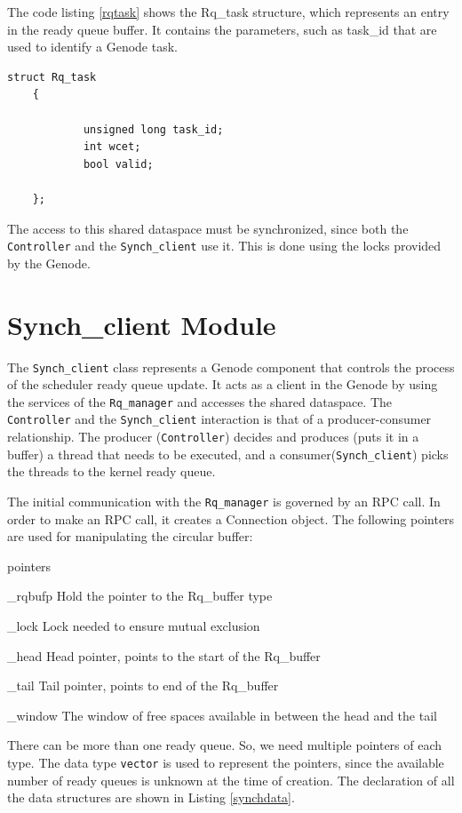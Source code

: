The code listing \ref{rqtask} shows the Rq\_task structure, which represents an entry in the ready queue buffer. It contains the parameters, such as task\_id that are used to identify a Genode task.

\begin{lstlisting}[caption={Rq\_task structure},label={rqtask}, style=customcpp]
 struct Rq_task
 	{
 
			unsigned long task_id;
 			int wcet;
 			bool valid;
 
 	};
\end{lstlisting}

The access to this shared dataspace must be synchronized, since both the \texttt{Controller} and the \texttt{Synch\_client} use it. This is done using the locks provided by the Genode.

\section{Synch\_client Module}
The \texttt{Synch\_client} class represents a Genode component that controls the process of the scheduler ready queue update. It acts as a client in the Genode by using the services of the \texttt{Rq\_manager} and accesses the shared dataspace. The \texttt{Controller} and the \texttt{Synch\_client} interaction is that of a producer-consumer relationship. The producer (\texttt{Controller}) decides and produces (puts it in a buffer) a thread that needs to be executed, and a consumer(\texttt{Synch\_client}) picks the threads to the kernel ready queue.

The initial communication with the \texttt{Rq\_manager} is governed by an RPC call. In order to make an RPC call, it creates a Connection object. The following pointers are used for manipulating the circular buffer:

\begin{labeling}{pointers}
	\item [\_rqbufp] Hold the pointer to the Rq\_buffer type
	\item [\_lock] Lock needed to ensure mutual exclusion
	\item [\_head] Head pointer, points to the start of the Rq\_buffer
	\item [\_tail] Tail pointer, points to end of the Rq\_buffer
	\item [\_window] The window of free spaces available in between the head and the tail
\end{labeling}
 
There can be more than one ready queue. So, we need multiple pointers of each type. The data type \texttt{vector} is used to represent the pointers, since the available number of ready queues is unknown at the time of creation. The declaration of all the data structures are shown in Listing \ref{synchdata}. 

